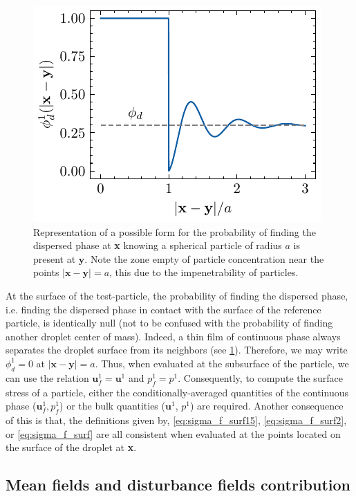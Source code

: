 \begin{figure}[h!]
    \centering
    \includegraphics[width=0.2\textheight]{image/dist_phi.pdf}
    \caption{Representation of a possible form for the probability of finding the dispersed phase at \textbf{x} knowing a spherical particle of radius $a$ is present at $\textbf{y}$.
    Note the zone empty of particle concentration near the points $|\textbf{x}- \textbf{y}|=a$, this due to the impenetrability of particles. 
    }
    \label{fig:distrib}
\end{figure}
At the surface of the test-particle, the probability of finding the dispersed phase, i.e. finding the dispersed phase in contact with the surface of the reference particle, is identically null (not to be confused with the probability of finding another droplet center of mass). 
Indeed, a thin film of continuous phase always separates the droplet surface from its neighbors (see \ref{fig:distrib}).
Therefore, we may write $\phi_d^1 = 0$ at $|\textbf{x}- \textbf{y}| =a$. 
Thus, when evaluated at the subsurface of the particle, we can use the relation $\textbf{u}_f^1 = \textbf{u}^1$ and $p_f^1 = p^1$. 
Consequently, to compute the surface stress of a particle, either the conditionally-averaged quantities of the continuous phase ($\textbf{u}_f^1, p_f^1$) or the bulk quantities ($\textbf{u}^1$, $p^1$) are required. 
Another consequence of this is that, the definitions given by, \ref{eq:sigma_f_surf15}, \ref{eq:sigma_f_surf2}, or \ref{eq:sigma_f_surf} are all consistent when evaluated at the points located on the surface of the droplet at \textbf{x}. 

\subsection{Mean fields and disturbance fields contribution}

